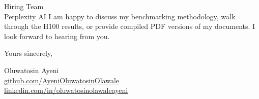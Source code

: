 \documentclass[12pt,a4paper]{letter}
\begin{document}
\begin{letter}{Hiring Team \\ Perplexity AI}
I am happy to discuss my benchmarking methodology, walk through the H100 results, or provide compiled PDF versions of my documents. I look forward to hearing from you.

\closing{Yours sincerely,}

Oluwatosin Ayeni \\
\href{https://github.com/AyeniOluwatosinOlawale}{github.com/AyeniOluwatosinOlawale} \\
\href{https://www.linkedin.com/in/oluwatosinolawaleayeni/}{linkedin.com/in/oluwatosinolawaleayeni}

\end{letter}
\end{document}
